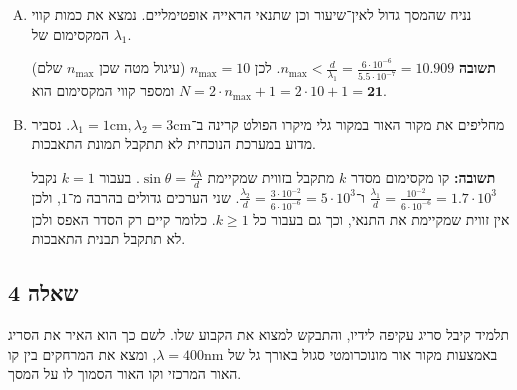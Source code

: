 \documentclass[]{../../../tex/classes/styledArticle}
\renewcommand\lg{\lambda}
\newcommand\cm{\mathrm{cm}}
\newcommand\mrm[1]{\mathrm{#1}}
\begin{document}
\begin{enumerate}[(A)]
		(הערה: מינימליות נובעת מזה ש־$\gcd(5, 6) = 1$)
		
		\item נניח שהמסך גדול לאין־שיעור וכן שתנאי הראייה אופטימליים. נמצא את כמות קווי המקסימום של $\lg_1$. 
		
		\textbf{תשובה }$n_{\max} < \frac{d}{\lg_1} = \frac{6 \cdot 10^{-6}}{5.5 \cdot 10^{-7}} = 10.909$. לכן $n_{\max} = 10$ (עיגול מטה שכן $n_{\max}$ שלם) ומספר קווי המקסימום הוא $N = 2 \cdot n_{\max} + 1 = 2 \cdot 10 + 1 = \bm{21}$. 
		
		\item מחליפים את מקור האור במקור גלי מיקרו הפולט קרינה ב־$\lg_1 = 1\cm, \lg_2= 3\cm$. נסביר מדוע במערכת הנוכחית לא תתקבל תמונת התאבכות. 
		
		\textbf{תשובה: }קו מקסימום מסדר $k$ מתקבל בזווית שמקיימת $\sin\theta = \frac{k\lg}{d}$. בעבור $k = 1$ נקבל $\frac{\lg_1}{d} = \frac{10^{-2}}{6 \cdot 10^{-6}} = 1.7 \cdot 10^{3}$ ו־$\frac{\lg_2}{d} = \frac{3 \cdot 10^{-2}}{6 \cdot 10^{-6}} = 5 \cdot 10^{3}$. שני הערכים גדולים בהרבה מ־$1$, ולכן אין זווית שמקיימת את התנאי, וכך גם בעבור כל $k \ge 1$. כלומר קיים רק הסדר האפס ולכן לא תתקבל תבנית התאבכות. 
	\end{enumerate}
	
	
	\subsection{שאלה 4}
	תלמיד קיבל סריג עקיפה לידיו, והתבקש למצוא את הקבוע שלו. לשם כך הוא האיר את הסריג באמצעות מקור אור מונוכרומטי סגול באורך גל של $\lg = 400\mrm{nm}$, ומצא את המרחקים בין קו האור המרכזי וקו האור הסמוך לו על המסך. 
	
\end{document}
